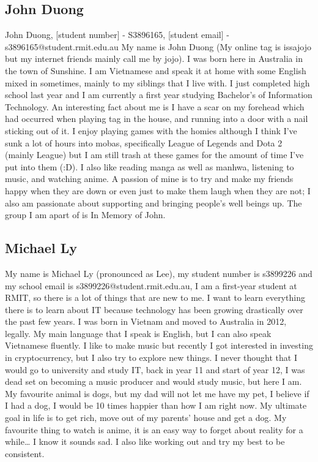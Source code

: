 \documentclass[a4paper,12pt]{extreport}
\begin{document}
	  \subsection*{John Duong}

	      John Duong, [student number] - S3896165, [student email] - s3896165@student.rmit.edu.au
	      My name is John Duong (My online tag is issajojo but my internet friends mainly call me by jojo). I was born here in Australia in the town of Sunshine. I am Vietnamese and speak it at home with some English mixed in sometimes, mainly to my siblings that I live with. I just completed high school last year and I am currently a first year studying Bachelor’s of Information Technology. An interesting fact about me is I have a scar on my forehead which had occurred when playing tag in the house, and running into a door with a nail sticking out of it. I enjoy playing games with the homies although I think I've sunk a lot of hours into mobas, specifically League of Legends and Dota 2 (mainly League) but I am still trash at these games for the amount of time I’ve put into them (:D). I also like reading manga as well as manhwa, listening to music, and watching anime. A passion of mine is to try and make my friends happy when they are down or even just to make them laugh when they are not; I also am passionate about supporting and bringing people’s well beings up. The group I am apart of is In Memory of John.\newline

	  \subsection*{Michael Ly}

	      My name is Michael Ly (pronounced as Lee), my student number is s3899226 and my school email is s3899226@student.rmit.edu.au, I am a first-year student at RMIT, so there is a lot of things that are new to me. I want to learn everything there is to learn about IT because technology has been growing drastically over the past few years. I was born in Vietnam and moved to Australia in 2012, legally. My main language that I speak is English, but I can also speak Vietnamese fluently. I like to make music but recently I got interested in investing in cryptocurrency, but I also try to explore new things. I never thought that I would go to university and study IT, back in year 11 and start of year 12, I was dead set on becoming a music producer and would study music, but here I am. My favourite animal is dogs, but my dad will not let me have my pet, I believe if I had a dog, I would be 10 times happier than how I am right now. My ultimate goal in life is to get rich, move out of my parents’ house and get a dog. My favourite thing to watch is anime, it is an easy way to forget about reality for a while… I know it sounds sad. I also like working out and try my best to be consistent.\newline
\end{document}
